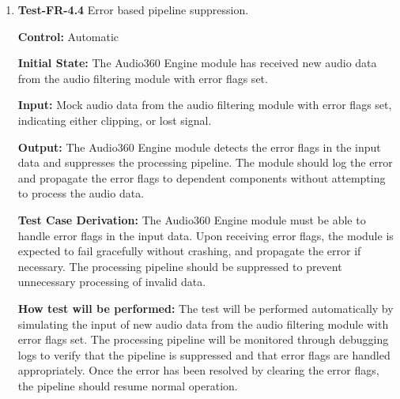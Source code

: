 \documentclass[12pt, titlepage]{article}
\begin{document}
\begin{enumerate}
\textbf{Output:}
The Audio360 Engine module manages the flow of data through the processing
pipeline. It ensures that each component processes the data in the correct order
and that the output of one component is correctly passed as input to the next
component. Every dependent component in the pipeline is executed correctly
and in order.

\textbf{Test Case Derivation:}
The Audio360 Engine module must manage the flow of data through the processing
pipeline. Since individual dependent components are not expected to be aware of
other components in the pipeline, the Audio360 Engine module must ensure that
data is passed correctly between components, ensuring data integrity. The module
also needs to consider error states of each module to ensure that the pipeline
can handle errors gracefully.

\textbf{How test will be performed:}
The test will be performed automatically by simulating the input of new audio
data from the audio filtering module. The flow of data through the pipeline will
be monitored through debugging logs to verify that each component processes the
data in the correct order and that the output of one component is correctly
passed as input to the next component.

\item{\textbf{Test-FR-4.4} Error based pipeline suppression.\\}

\textbf{Control:} Automatic

\textbf{Initial State:}
The Audio360 Engine module has received new audio data from the audio filtering
module with error flags set.

\textbf{Input:}
Mock audio data from the audio filtering module with error flags set, indicating
either clipping, or lost signal.

\textbf{Output:}
The Audio360 Engine module detects the error flags in the input data and
suppresses the processing pipeline. The module should log the error and
propagate the error flags to dependent components without attempting to process
the audio data. 

\textbf{Test Case Derivation:}
The Audio360 Engine module must be able to handle error flags in the input data.
Upon receiving error flags, the module is expected to fail gracefully without
crashing, and propagate the error if necessary. The processing pipeline should
be suppressed to prevent unnecessary processing of invalid data.

\textbf{How test will be performed:}
The test will be performed automatically by simulating the input of new audio
data from the audio filtering module with error flags set. The processing
pipeline will be monitored through debugging logs to verify that the pipeline is
suppressed and that error flags are handled appropriately. Once the error has
been resolved by clearing the error flags, the pipeline should resume normal
operation.

\end{enumerate}
\end{document}
